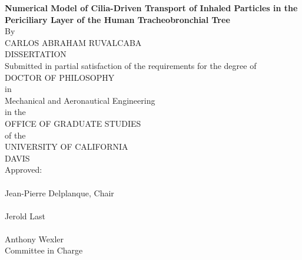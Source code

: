 \begin{center}
   \null\vfill
   \textbf{%
         Numerical Model of Cilia-Driven Transport of Inhaled Particles in the Periciliary Layer of the Human Tracheobronchial Tree
   }%
   \\
   \bigskip
   By \\
   \bigskip
   CARLOS ABRAHAM RUVALCABA \\
   DISSERTATION \\
   \bigskip
   Submitted in partial satisfaction of the requirements for the
   degree of \\
   \bigskip
   DOCTOR OF PHILOSOPHY \\
   \bigskip
   in \\
   \bigskip
   Mechanical and Aeronautical Engineering \\
   \bigskip
   in the \\
   \bigskip
   OFFICE OF GRADUATE STUDIES \\
   \bigskip        
   of the \\
   \bigskip
   UNIVERSITY OF CALIFORNIA \\
   \bigskip
   DAVIS \\
   \bigskip
   Approved: \\
   \bigskip
   \bigskip
   \makebox[3in]{\hrulefill} \\
   Jean-Pierre Delplanque, Chair \\
   \bigskip
   \bigskip
   \makebox[3in]{\hrulefill} \\
   Jerold Last \\
   \bigskip
   \bigskip
   \makebox[3in]{\hrulefill} \\
   Anthony Wexler \\
   \bigskip
   Committee in Charge \\
    \\
   \vfill
\end{center}
